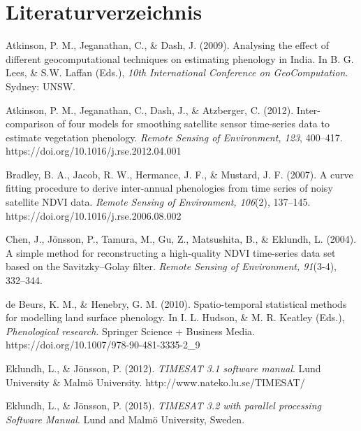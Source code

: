 \documentclass[11pt]{report}
\begin{document}
%
%
\chapter{Literaturverzeichnis}

\newcommand{\litentry}[1]{\hangindent=1cm #1\par\medskip}

\litentry{Atkinson, P. M., Jeganathan, C., \& Dash, J. (2009). Analysing the effect of different geocomputational techniques on estimating phenology in India. In B. G. Lees, \& S.W. Laffan (Eds.), \textit{10th International Conference on GeoComputation}. Sydney: UNSW.}

\litentry{Atkinson, P. M., Jeganathan, C., Dash, J., \& Atzberger, C. (2012). Inter-comparison of four models for smoothing satellite sensor time-series data to estimate vegetation phenology. \textit{Remote Sensing of Environment, 123}, 400--417. https://doi.org/10.1016/j.rse.2012.04.001}


\litentry{Bradley, B. A., Jacob, R. W., Hermance, J. F., \& Mustard, J. F. (2007). A curve fitting procedure to derive inter-annual phenologies from time series of noisy satellite NDVI data. \textit{Remote Sensing of Environment, 106}(2), 137--145. https://doi.org/10.1016/j.rse.2006.08.002}

\litentry{Chen, J., Jönsson, P., Tamura, M., Gu, Z., Matsushita, B., \& Eklundh, L. (2004). A simple method for reconstructing a high-quality NDVI time-series data set based on the Savitzky–Golay filter. \textit{Remote Sensing of Environment, 91}(3-4), 332--344.}

\litentry{de Beurs, K. M., \& Henebry, G. M. (2010). Spatio-temporal statistical methods for modelling land surface phenology. In I. L. Hudson, \& M. R. Keatley (Eds.), \textit{Phenological research}. Springer Science + Business Media. https://doi.org/10.1007/978-90-481-3335-2\_9}

\litentry{Eklundh, L., \& Jönsson, P. (2012). \textit{TIMESAT 3.1 software manual}. Lund University \& Malmö University. http://www.nateko.lu.se/TIMESAT/}

\litentry{Eklundh, L., \& Jönsson, P. (2015). \textit{TIMESAT 3.2 with parallel processing Software Manual}. Lund and Malmö University, Sweden.}
\end{document}
